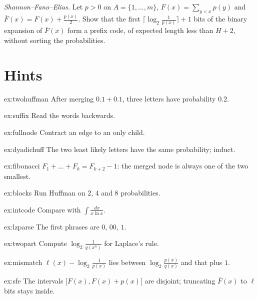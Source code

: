 \begin{exercise}[$\star\star\star$]\label{ex:sfe}
\emph{Shannon--Fano--Elias.} Let $p>0$ on $A=\{1,\dots,m\}$, $F(x)=\sum_{y<x}p(y)$ and $\bar F(x)=F(x)+\frac{p(x)}2$. Show that the first $\lceil\log_2\frac1{p(x)}\rceil+1$ bits of the binary expansion of $\bar F(x)$ form a prefix code, of expected length less than $H+2$, without sorting the probabilities.
\end{exercise}

\section{Hints}

\begin{hint}{ex:twohuffman}
After merging $0.1+0.1$, three letters have probability $0.2$.
\end{hint}
\begin{hint}{ex:suffix}
Read the words backwards.
\end{hint}
\begin{hint}{ex:fullnode}
Contract an edge to an only child.
\end{hint}
\begin{hint}{ex:dyadichuff}
The two least likely letters have the same probability; induct.
\end{hint}
\begin{hint}{ex:fibonacci}
$F_1+\dots+F_k=F_{k+2}-1$: the merged node is always one of the two smallest.
\end{hint}
\begin{hint}{ex:blocks}
Run Huffman on $2$, $4$ and $8$ probabilities.
\end{hint}
\begin{hint}{ex:intcode}
Compare with $\int\frac{dx}{x\ln x}$.
\end{hint}
\begin{hint}{ex:lzparse}
The first phrases are $0$, $00$, $1$.
\end{hint}
\begin{hint}{ex:twopart}
Compute $\log_2\frac1{q(x^n)}$ for Laplace's rule.
\end{hint}
\begin{hint}{ex:mismatch}
$\ell(x)-\log_2\frac1{p(x)}$ lies between $\log_2\frac{p(x)}{q(x)}$ and that plus $1$.
\end{hint}
\begin{hint}{ex:sfe}
The intervals $[F(x),F(x)+p(x)[$ are disjoint; truncating $\bar F(x)$ to $\ell$ bits stays inside.
\end{hint}

